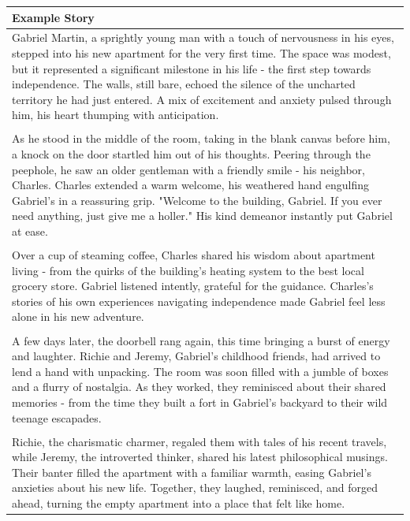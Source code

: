 \begin{small}
\onecolumn
\begin{longtable}{p{}}
\toprule
\textbf{Example Story}\\
\midrule
Gabriel Martin, a sprightly young man with a touch of nervousness in his eyes, stepped into his new apartment for the very first time. The space was modest, but it represented a significant milestone in his life - the first step towards independence. The walls, still bare, echoed the silence of the uncharted territory he had just entered. A mix of excitement and anxiety pulsed through him, his heart thumping with anticipation.
\\
\\
As he stood in the middle of the room, taking in the blank canvas before him, a knock on the door startled him out of his thoughts. Peering through the peephole, he saw an older gentleman with a friendly smile - his neighbor, Charles. Charles extended a warm welcome, his weathered hand engulfing Gabriel's in a reassuring grip. "Welcome to the building, Gabriel. If you ever need anything, just give me a holler." His kind demeanor instantly put Gabriel at ease.
\\
\\
Over a cup of steaming coffee, Charles shared his wisdom about apartment living - from the quirks of the building's heating system to the best local grocery store. Gabriel listened intently, grateful for the guidance. Charles's stories of his own experiences navigating independence made Gabriel feel less alone in his new adventure.
\\
\\
A few days later, the doorbell rang again, this time bringing a burst of energy and laughter. Richie and Jeremy, Gabriel's childhood friends, had arrived to lend a hand with unpacking. The room was soon filled with a jumble of boxes and a flurry of nostalgia. As they worked, they reminisced about their shared memories - from the time they built a fort in Gabriel's backyard to their wild teenage escapades.
\\
\\
Richie, the charismatic charmer, regaled them with tales of his recent travels, while Jeremy, the introverted thinker, shared his latest philosophical musings. Their banter filled the apartment with a familiar warmth, easing Gabriel's anxieties about his new life. Together, they laughed, reminisced, and forged ahead, turning the empty apartment into a place that felt like home.
\\

\end{longtable}
\end{small}
